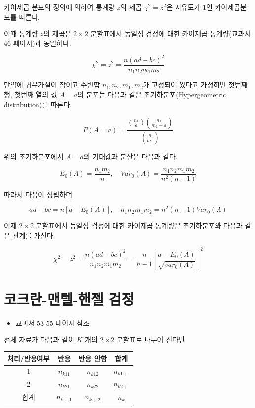 \documentclass[
]{book}
\providecommand{\tightlist}{%
  \setlength{\itemsep}{0pt}\setlength{\parskip}{0pt}}
\theoremstyle{definition}
\theoremstyle{definition}
\theoremstyle{definition}
\theoremstyle{definition}
\theoremstyle{remark}
\begin{document}
카이제곱 분포의 정의에 의하여 통계량 \(z\)의 제곱 \(\chi^2 = z^2\)은 자유도가 1인 카이제곱분포를 따른다.

이때 통계량 \(z\)의 제곱은 \(2 \times 2\) 분할표에서 동일성 검정에 대한 카이제곱 통계량(교과서 46 페이지)과 동일하다.

\[ \chi^2 = z^2 = \frac {n(ad-bc)^2}{n_1 n_2 m_1 m_2} \]

만약에 귀무가설이 참이고 주변합 \(n_1, n_2, m_1, m_2\)가 고정되어 있다고 가정하면 첫번째 행, 첫번째 열의 값 \(A=a\)의 분포는 다음과 같은 초기하분포(Hypergeometric distribution)를 따른다.

\[ P(A=a) = \frac{ \binom{n_1}{a} \binom{n_2}{m_1-a} } {\binom{n}{m_1}} \]

위의 초기하분포에서 \(A=a\)의 기대값과 분산은 다음과 같다.

\[ E_0(A) = \frac{n_1 m_2}{n}, \quad Var_0 (A) = \frac{n_1 n_2 m_1 m_2}{n^2(n-1)} \]

따라서 다음이 성립하며

\[ ad-bc = n[a-E_0(A)], \quad n_1 n_2 m_1 m_2 = n^2(n-1)  Var_0 (A)  \]

이제 \(2 \times 2\) 분할표에서 동일성 검정에 대한 카이제곱 통계량은 초기하분포와 다음과 같은 관계를 가진다.

\[ \chi^2 = z^2 = \frac {n(ad-bc)^2}{n_1 n_2 m_1 m_2} = \frac{n}{n-1} \left [ \frac{a-E_0(A)}{\sqrt{var_0(A)}} \right ]^2 \]

\hypertarget{uxcf54uxd06cuxb780-uxb9e8uxd154-uxd578uxc824-uxac80uxc815}{%
\section{코크란-맨텔-핸젤 검정}\label{uxcf54uxd06cuxb780-uxb9e8uxd154-uxd578uxc824-uxac80uxc815}}

\begin{itemize}
\tightlist
\item
  교과서 53-55 페이지 참조
\end{itemize}

전체 자료가 다음과 같이 \(K\) 개의 \(2 \times 2\) 분할표로 나누어 진다면

\begin{longtable}[]{@{}cccc@{}}
\toprule
처리/반응여부 & 반응 & 반응 안함 & 합계\tabularnewline
\midrule
\endhead
1 & \(n_{k11}\) & \(n_{k12}\) & \(n_{k1+}\)\tabularnewline
2 & \(n_{k21}\) & \(n_{k22}\) & \(n_{k2+}\)\tabularnewline
합계 & \(n_{k+1}\) & \(n_{k+2}\) & \(n_{k}\)\tabularnewline
\bottomrule
\end{longtable}
\end{document}
